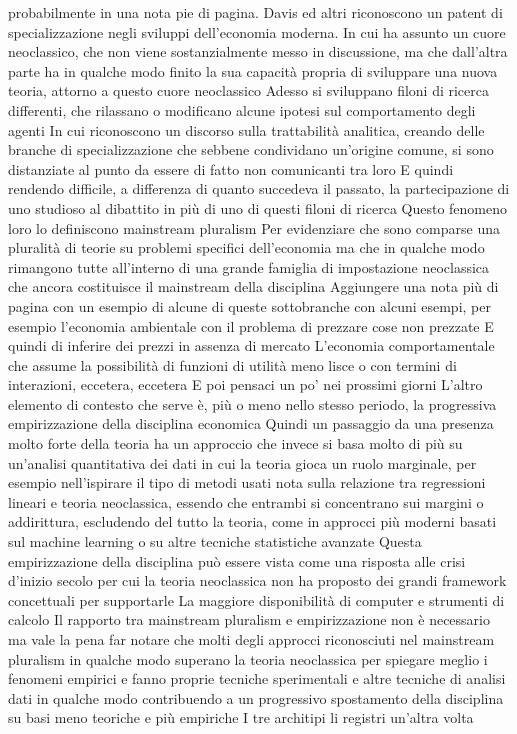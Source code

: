\documentclass[a4paper, headings=standardclasses]{scrartcl}
\begin{document}
probabilmente in una nota pie di pagina.
Davis ed altri riconoscono un patent di specializzazione negli sviluppi dell'economia moderna.
In cui ha assunto un cuore neoclassico, che non viene sostanzialmente messo in discussione, ma che dall'altra parte
ha in qualche modo finito la sua capacità propria di sviluppare una nuova teoria, attorno a questo cuore neoclassico
Adesso si sviluppano filoni di ricerca differenti, che rilassano o modificano alcune ipotesi sul comportamento degli agenti
In cui riconoscono un discorso sulla trattabilità analitica, creando delle branche di specializzazione
che sebbene condividano un'origine comune, si sono distanziate al punto da essere di fatto non comunicanti tra loro
E quindi rendendo difficile, a differenza di quanto succedeva il passato, la partecipazione di uno studioso al dibattito
in più di uno di questi filoni di ricerca
Questo fenomeno loro lo definiscono mainstream pluralism
Per evidenziare che sono comparse una pluralità di teorie su problemi specifici dell'economia
ma che in qualche modo rimangono tutte all'interno di una grande famiglia di impostazione neoclassica che ancora costituisce il mainstream della disciplina
Aggiungere una nota più di pagina con un esempio di alcune di queste sottobranche
con alcuni esempi, per esempio l'economia ambientale con il problema di prezzare cose non prezzate
E quindi di inferire dei prezzi in assenza di mercato
L'economia comportamentale che assume la possibilità di funzioni di utilità meno lisce o con termini di interazioni, eccetera, eccetera
E poi pensaci un po' nei prossimi giorni
L'altro elemento di contesto che serve è, più o meno nello stesso periodo, la progressiva empirizzazione della disciplina economica
Quindi un passaggio da una presenza molto forte della teoria
ha un approccio che invece si basa molto di più su un'analisi quantitativa dei dati
in cui la teoria gioca un ruolo marginale, per esempio nell'ispirare il tipo di metodi usati
nota sulla relazione tra regressioni lineari e teoria neoclassica, essendo che entrambi si concentrano sui margini
o addirittura, escludendo del tutto la teoria, come in approcci più moderni basati sul machine learning
o su altre tecniche statistiche avanzate
Questa empirizzazione della disciplina può essere vista come una risposta alle crisi d'inizio secolo
per cui la teoria neoclassica non ha proposto dei grandi framework concettuali per supportarle
La maggiore disponibilità di computer e strumenti di calcolo
Il rapporto tra mainstream pluralism e empirizzazione non è necessario
ma vale la pena far notare che molti degli approcci riconosciuti nel mainstream pluralism
in qualche modo superano la teoria neoclassica per spiegare meglio i fenomeni empirici
e fanno proprie tecniche sperimentali e altre tecniche di analisi dati
in qualche modo contribuendo a un progressivo spostamento della disciplina su basi meno teoriche e più empiriche
I tre architipi li registri un'altra volta
\end{document}
